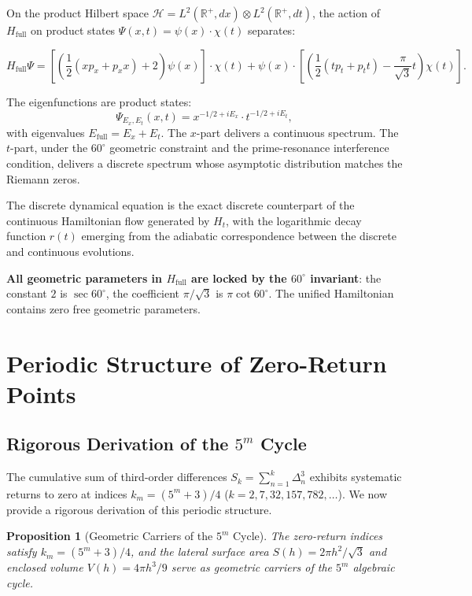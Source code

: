 \documentclass[12pt,a4paper]{article}
\newtheorem{proposition}[theorem]{Proposition}
\begin{document}
On the product Hilbert space $\mathcal{H} = L^2(\mathbb{R}^+, dx) \otimes L^2(\mathbb{R}^+, dt)$, the action of $H_{\text{full}}$ on product states $\Psi(x,t) = \psi(x) \cdot \chi(t)$ separates:

\begin{equation}
H_{\text{full}}\Psi = \left[\left(\frac{1}{2}(x p_x + p_x x) + 2\right)\psi(x)\right] \cdot \chi(t) + \psi(x) \cdot \left[\left(\frac{1}{2}(t p_t + p_t t) - \frac{\pi}{\sqrt{3}}t\right)\chi(t)\right].
\end{equation}

The eigenfunctions are product states:
\begin{equation}
\Psi_{E_x, E_t}(x, t) = x^{-1/2 + iE_x} \cdot t^{-1/2 + iE_t},
\end{equation}
with eigenvalues $E_{\text{full}} = E_x + E_t$. The $x$-part delivers a continuous spectrum. The $t$-part, under the $60^\circ$ geometric constraint and the prime-resonance interference condition, delivers a discrete spectrum whose asymptotic distribution matches the Riemann zeros.

The discrete dynamical equation is the exact discrete counterpart of the continuous Hamiltonian flow generated by $H_t$, with the logarithmic decay function $r(t)$ emerging from the adiabatic correspondence between the discrete and continuous evolutions.

\textbf{All geometric parameters in $H_{\text{full}}$ are locked by the $60^\circ$ invariant}: the constant $2$ is $\sec 60^\circ$, the coefficient $\pi/\sqrt{3}$ is $\pi\cot 60^\circ$. The unified Hamiltonian contains zero free geometric parameters.

\section{Periodic Structure of Zero-Return Points}

\subsection{Rigorous Derivation of the $5^m$ Cycle}

The cumulative sum of third-order differences $S_k = \sum_{n=1}^k \Delta_n^3$ exhibits systematic returns to zero at indices $k_m = (5^m+3)/4$ ($k = 2, 7, 32, 157, 782, \dots$). We now provide a rigorous derivation of this periodic structure.

\begin{proposition}[Geometric Carriers of the $5^m$ Cycle]
\label{prop:periodic}
The zero-return indices satisfy $k_m = (5^m+3)/4$, and the lateral surface area $S(h) = 2\pi h^2/\sqrt{3}$ and enclosed volume $V(h) = 4\pi h^3/9$ serve as geometric carriers of the $5^m$ algebraic cycle.
\end{proposition}
\end{document}
